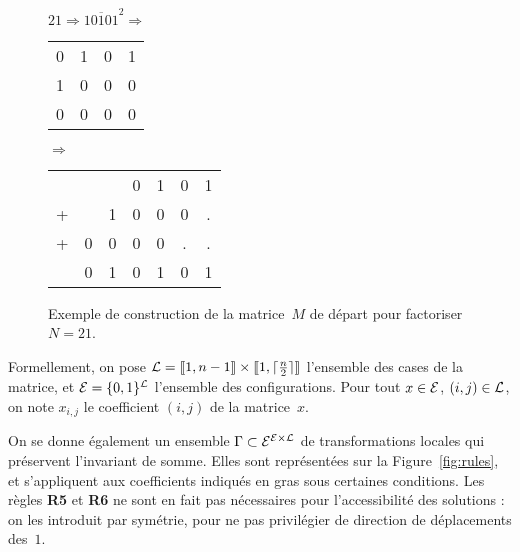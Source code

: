 \begin{figure}[h]
\centering

$21 \Rightarrow \overline{10101}^2 \Rightarrow$
\begin{tabular}{cccc}
0&1&0&1\\
1&0&0&0\\
0&0&0&0\\
\end{tabular}
$\Rightarrow$
\begin{tabular}{ccccccc}
&&&0&1&0&1\\
+&&1&0&0&0&.\\
+&0&0&0&0&.&.\\
\hline
&0&1&0&1&0&1\\
\end{tabular}

\caption{Exemple de construction de la matrice~$M$ de départ pour factoriser $N=21$.}
\label{fig:init}
\end{figure}

Formellement, on pose $\mathcal{L}=[\kern-0.15em [ 1, n-1 ]\kern-0.15em] \times [\kern-0.15em [ 1, \lceil\frac{n}{2}\rceil]\kern-0.15em]$ l'ensemble des cases de la matrice, et $\mathcal{E}=\{0,1\}^{\mathcal{L}}$ l'ensemble des configurations. Pour tout $x \in \mathcal{E}$, $(i,j)\in\mathcal{L}$, on note $x_{i,j}$ le coefficient $(i,j)$ de la matrice~$x$. 

On se donne également un ensemble $\Gamma \subset \mathcal{E}^{\mathcal{E}\times\mathcal{L}}$ de transformations locales qui préservent l'invariant de somme. Elles sont représentées sur la Figure~\ref{fig:rules}, et s'appliquent aux coefficients indiqués en gras sous certaines conditions. Les règles \textbf{R5} et \textbf{R6} ne sont en fait pas nécessaires pour l'accessibilité des solutions : on les introduit par symétrie, pour ne pas privilégier de direction de déplacements des~$1$. 


